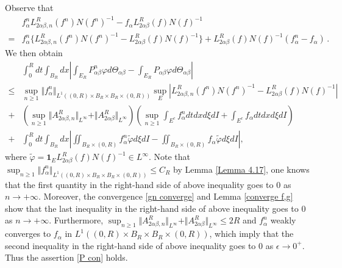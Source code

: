 \documentclass[reqno,11pt]{amsart}
\numberwithin{equation}{section}
\begin{document}
Observe that
\begin{equation*}
	\begin{aligned}
		& f^n_\alpha L^R_{2\alpha \beta, n }(f^n) N (f^n)^{-1} - f_\alpha L^R_{2\alpha \beta}(f) N (f)^{-1} \\
        = & f^n_\alpha \{ L^R_{2\alpha \beta, n } (f^n) N (f^n)^{-1} - L^R_{2\alpha \beta}(f) N (f)^{-1} \} + L^R_{2\alpha \beta }(f) N (f)^{-1} (f^n_\alpha -f_\alpha) \,.
	\end{aligned}
\end{equation*}
We then obtain
\begin{equation*}
\begin{aligned}
&\int_{0}^{R}dt \int_{B_R} dx |\int_{E_R}   P^n_{\alpha \beta}\varphi d \Theta_{\alpha \beta } -\int_{E_R} P_{\alpha \beta}\varphi d\Theta_{\alpha \beta }| \\
\leq & \sup_{n \geq 1} \Vert f^n_\alpha \Vert_{L^1 ((0, R) \times B_R \times B_R \times (0, R))} \sup \limits_{E} | L^R_{2\alpha \beta, n }(f^n) N (f^n)^{-1} - L^R_{2\alpha \beta }(f) N (f)^{-1} | \\
+ & ( \sup_{n \geq 1} \Vert A^R_{2\alpha \beta, n } \Vert_{L^\infty} + \Vert A^R_{2\alpha \beta } \Vert_{L^\infty} ) ( \sup_{n \geq 1} \int_{E^c} f^n_\alpha dtdxd\xi dI +\int_{E^c} f_\alpha dtdxd\xi dI) \\
+& \int_{0}^{R}dt \int_{B_R} dx |\iint_{B_R \times (0,R)} f^n_\alpha \tilde{\varphi} d\xi dI -\iint_{B_R \times (0,R)} f_\alpha \tilde{\varphi} d\xi dI |,
\end{aligned}
\end{equation*}
where $\tilde{\varphi}= \mathbf{1}_E L^R_{2\alpha \beta }(f) N (f)^{-1} \in L^\infty$. Note that $\sup_{n \geq 1} \Vert f^n_\alpha \Vert_{L^1 ((0, R) \times B_R \times B_R \times (0, R))} \leq C_R$ by Lemma \ref{Lemma 4.17}, one knows that the first quantity in the right-hand side of above inequality goes to 0 as $n \to + \infty$. Moreover, the convergence \eqref{gn converge} and Lemma \ref{converge f,g} show that the last inequality in the right-hand side of above inequality goes to 0 as $n \to + \infty$. Furthermore, $\sup_{n \geq 1} \Vert A^R_{2\alpha \beta, n } \Vert_{L^\infty} + \Vert A^R_{2\alpha \beta } \Vert_{L^\infty} \leq 2 R$ and $f^n_\alpha $ weakly converges to $f_\alpha$ in $L^1 ( (0, R) \times B_R \times B_R \times (0, R) )$, which imply that the second inequality in the right-hand side of above inequality goes to 0 as $\epsilon \to 0^+$. Thus the assertion \eqref{P con} holds.
\end{document}
